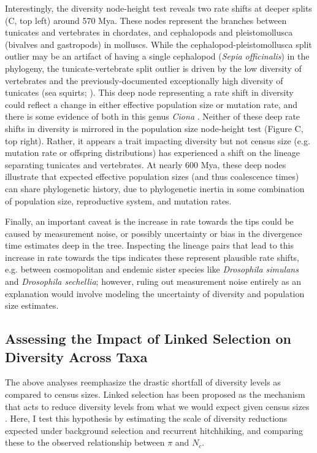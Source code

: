 \documentclass[9pt,lineno]{elife}
\begin{document}
Interestingly, the diversity node-height test reveals two rate shifts at deeper
splits (C, top left) around 570 Mya. These nodes represent the
branches between tunicates and vertebrates in chordates, and cephalopods and
pleistomollusca (bivalves and gastropods) in molluscs.  While the
cephalopod-pleistomollusca split outlier may be an artifact of having a single
cephalopod (\emph{Sepia officinalis}) in the phylogeny, the tunicate-vertebrate
split outlier is driven by the low diversity of vertebrates and the
previously-documented exceptionally high diversity of tunicates (sea squirts;
\cite{Nydam2010-kg,Small2007-mt}). This deep node representing a rate shift in
diversity could reflect a change in either effective population size or
mutation rate, and there is some evidence of both in this genus \emph{Ciona}
\citep{Small2007-mt,Tsagkogeorga2012-lv}. Neither of these deep rate shifts in
diversity is mirrored in the population size node-height test (Figure
C, top right). Rather, it appears a trait impacting diversity but not
census size (e.g. mutation rate or offspring distributions) has experienced a
shift on the lineage separating tunicates and vertebrates. At nearly 600 Mya,
these deep nodes illustrate that expected effective population sizes (and thus
coalescence times) can share phylogenetic history, due to phylogenetic inertia
in some combination of population size, reproductive system, and mutation
rates.

Finally, an important caveat is the increase in rate towards the tips could be
caused by measurement noise, or possibly uncertainty or bias in the divergence
time estimates deep in the tree. Inspecting the lineage pairs that lead to this
increase in rate towards the tips indicates these represent plausible rate
shifts, e.g.  between cosmopolitan and endemic sister species like
\emph{Drosophila simulans} and \emph{Drosophila sechellia}; however, ruling out
measurement noise entirely as an explanation would involve modeling the
uncertainty of diversity and population size estimates.

\subsection{Assessing the Impact of Linked Selection on Diversity Across Taxa}

The above analyses reemphasize the drastic shortfall of diversity levels as
compared to census sizes. Linked selection has been proposed as the mechanism
that acts to reduce diversity levels from what we would expect given census
sizes \citep{Maynard_Smith1974-zr,Gillespie2000-mh,Corbett-Detig2015-gt}.
Here, I test this hypothesis by estimating the scale of diversity reductions
expected under background selection and recurrent hitchhiking, and comparing
these to the observed relationship between $\pi$ and $N_c$. 
\end{document}
